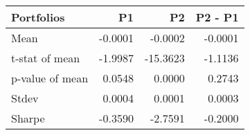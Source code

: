 \begin{tabular}{lrrr}
\toprule
Portfolios & P1 & P2 & P2 - P1 \\
\midrule
Mean & -0.0001 & -0.0002 & -0.0001 \\
t-stat of mean & -1.9987 & -15.3623 & -1.1136 \\
p-value of mean & 0.0548 & 0.0000 & 0.2743 \\
Stdev & 0.0004 & 0.0001 & 0.0003 \\
Sharpe & -0.3590 & -2.7591 & -0.2000 \\
\bottomrule
\end{tabular}
